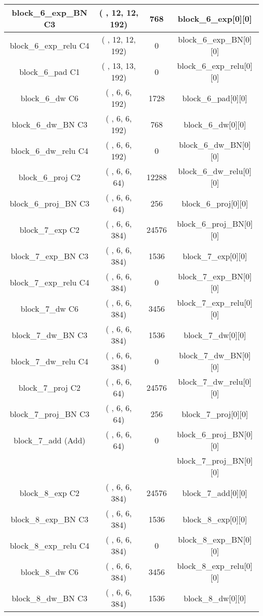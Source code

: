 \documentclass{bmvc2k}
\begin{document}
\begin{table}
\begin{tabular}{|c|c|c|c|}
block\_6\_exp\_BN C3 & ( , 12, 12, 192)&  768    &     block\_6\_exp[0][0]             \\ \hline
block\_6\_exp\_relu C4      & ( , 12, 12, 192)&  0      &     block\_6\_exp\_BN[0][0]          \\ \hline
block\_6\_pad C1     & ( , 13, 13, 192)&  0      &     block\_6\_exp\_relu[0][0]        \\ \hline
block\_6\_dw C6 & ( , 6, 6, 192)  &  1728   &     block\_6\_pad[0][0]                \\ \hline
block\_6\_dw\_BN C3 & ( , 6, 6, 192)  &  768    &     block\_6\_dw[0][0]          \\ \hline
block\_6\_dw\_relu C4   & ( , 6, 6, 192)  &  0      &     block\_6\_dw\_BN[0][0]       \\ \hline
block\_6\_proj C2        & ( , 6, 6, 64)   &  12288  &     block\_6\_dw\_relu[0][0]     \\ \hline
block\_6\_proj\_BN C3 & ( , 6, 6, 64)   &  256    &     block\_6\_proj[0][0]            \\ \hline
block\_7\_exp C2         & ( , 6, 6, 384)  &  24576  &     block\_6\_proj\_BN[0][0]         \\ \hline
block\_7\_exp\_BN C3 & ( , 6, 6, 384)  &  1536   &     block\_7\_exp[0][0]             \\ \hline
block\_7\_exp\_relu C4      & ( , 6, 6, 384)  &  0      &     block\_7\_exp\_BN[0][0]          \\ \hline
block\_7\_dw C6 & ( , 6, 6, 384)  &  3456   &     block\_7\_exp\_relu[0][0]        \\ \hline
block\_7\_dw\_BN C3 & ( , 6, 6, 384)  &  1536   &     block\_7\_dw[0][0]          \\ \hline
block\_7\_dw\_relu C4   & ( , 6, 6, 384)  &  0      &     block\_7\_dw\_BN[0][0]       \\ \hline
block\_7\_proj C2        & ( , 6, 6, 64)   &  24576  &     block\_7\_dw\_relu[0][0]     \\ \hline
block\_7\_proj\_BN C3 & ( , 6, 6, 64)   &  256    &     block\_7\_proj[0][0]            \\ \hline
block\_7\_add (Add)               & ( , 6, 6, 64)   &  0      &     block\_6\_proj\_BN[0][0]         \\ 
                                &                    &         &      block\_7\_proj\_BN[0][0]        \\ \hline
block\_8\_exp C2         & ( , 6, 6, 384)  &  24576  &     block\_7\_add[0][0]                \\ \hline
block\_8\_exp\_BN C3 & ( , 6, 6, 384)  &  1536   &     block\_8\_exp[0][0]             \\ \hline
block\_8\_exp\_relu C4      & ( , 6, 6, 384)  &  0      &     block\_8\_exp\_BN[0][0]          \\ \hline
block\_8\_dw C6 & ( , 6, 6, 384)  &  3456   &     block\_8\_exp\_relu[0][0]        \\ \hline
block\_8\_dw\_BN C3 & ( , 6, 6, 384)  &  1536   &     block\_8\_dw[0][0]          \\ \hline
\end{tabular}
\end{table}
\end{document}
